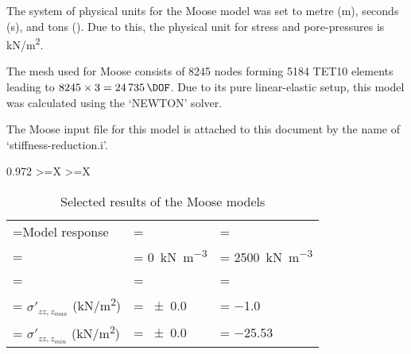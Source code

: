 The system of physical units for the Moose model was set to metre
(\unit{\metre}), seconds (\unit{\second}), and tons (\unit{\ton}). Due to this,
the physical unit for stress and pore-pressures is \unit[per-mode =
    symbol]{\kilo\newton\per\square\metre}.

The mesh used for Moose consists of \qty{8245}{} nodes forming \qty{5184}{}
TET10 elements leading to $\qty{8245}{} \times \qty{3}{} = \qty{24735}{\DOF}$.
Due to its pure linear-elastic setup, this model was calculated using the
‘NEWTON’ solver.

The Moose input file for this model is attached to this document by the name of
‘stiffness-reduction.i’.


\begin{table}[htbp]
    \centering
    \caption{Selected results of the Moose models}
    \label{stiffness-reduction:moose-results}

    \begin{tabularx}{0.972\hsize}{
            >{\hsize\linewidth=\hsize}X
            >{\hsize\linewidth=\hsize}X}
        {\begin{tabularx}{1\linewidth}{
                     >{\hsize\linewidth=\hsize}X
                     >{\hsize\linewidth=\hsize\hspace{-5pt}}Y
                     >{\hsize\linewidth=\hsize\hspace{-5pt}}Y}
                 \toprule
                 Model response                                                                                &                                                                                    \\
                 {}                                                                                            & \qty[per-mode = symbol]{0}{\kilo\newton\per\cubic\metre} & \qty[per-mode = symbol]{2500}{\kilo\newton\per\cubic\metre} \\
                 \midrule

                                                                                                                                                                                                 \\
                 \hspace{1em} $\sigma'_{zz,z_{max}}$ (\unit[per-mode = symbol]{\kilo\newton\per\square\metre}) & \qty{\pm0.0}{}                                           & \qty{-1.0}{}                                                \\
                 \hspace{1em} $\sigma'_{zz,z_{min}}$ (\unit[per-mode = symbol]{\kilo\newton\per\square\metre}) & \qty{\pm0.0}{}                                           & \qty{-25.53}{}                                              \\


\end{tabularx}}
\end{tabularx}
\end{table}
